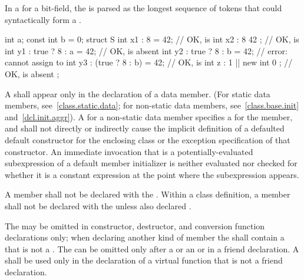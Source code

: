 \pnum
In a  for a bit-field,
the  is parsed as
the longest sequence of tokens
that could syntactically form a .
\begin{example}
\begin{codeblock}
int a;
const int b = 0;
struct S {
  int x1 : 8 = 42;              // OK,  is 
  int x2 : 8 { 42 };            // OK,  is 
  int y1 : true ? 8 : a = 42;   // OK,  is absent
  int y2 : true ? 8 : b = 42;   // error: cannot assign to 
  int y3 : (true ? 8 : b) = 42; // OK,  is 
  int z : 1 || new int { 0 };   // OK,  is absent
};
\end{codeblock}
\end{example}

\pnum
A  shall appear only in the
declaration of a data member. (For static data members,
see~\ref{class.static.data}; for non-static data members,
see~\ref{class.base.init} and~\ref{dcl.init.aggr}).
A  for a non-static data member
%
specifies a  for the member, and
shall not directly or indirectly cause the implicit definition of a
defaulted default constructor for the enclosing class or the
exception specification of that constructor.
An immediate invocation that
is a potentially-evaluated subexpression
of a default member initializer
is neither evaluated nor checked for whether it
is a constant expression at the point where the subexpression appears.

\pnum
A member shall not be declared with the 
. Within a class definition, a member shall not be declared with the   unless also declared .

\pnum
The  may be omitted in constructor, destructor,
and conversion function declarations only;
when declaring another kind of member the 
shall contain a  that is not a .
The
 can be omitted only after a
 or an  or in a
friend declaration. A
 shall be used only in the declaration of a
virtual function
that is not a friend declaration.

